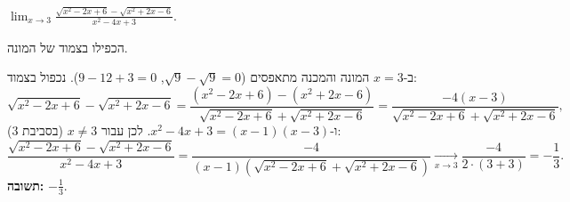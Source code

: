 
\begin{question}
$\displaystyle\lim_{x\to3}\frac{\sqrt{x^2-2x+6}-\sqrt{x^2+2x-6}}{x^2-4x+3}$.
\end{question}

\begin{hint}
הכפילו בצמוד של המונה.
\end{hint}

\begin{solution}
ב-$x=3$ המונה והמכנה מתאפסים ($\sqrt9-\sqrt9=0$, $9-12+3=0$). נכפול בצמוד:
\[
\sqrt{x^2-2x+6}-\sqrt{x^2+2x-6}=\frac{(x^2-2x+6)-(x^2+2x-6)}{\sqrt{x^2-2x+6}+\sqrt{x^2+2x-6}}=\frac{-4(x-3)}{\sqrt{x^2-2x+6}+\sqrt{x^2+2x-6}},
\]
ו-$x^2-4x+3=(x-1)(x-3)$. לכן עבור $x\neq3$ (בסביבת $3$):
\[
\frac{\sqrt{x^2-2x+6}-\sqrt{x^2+2x-6}}{x^2-4x+3}=\frac{-4}{(x-1)\left(\sqrt{x^2-2x+6}+\sqrt{x^2+2x-6}\right)}\xrightarrow[x\to3]{}\frac{-4}{2\cdot(3+3)}=-\frac13.
\]
\textbf{תשובה:} $-\frac13$.
\end{solution}

